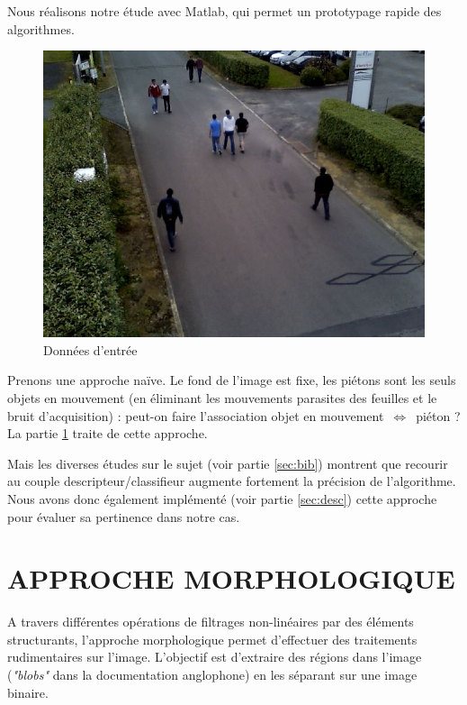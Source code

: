 \documentclass{article}
\begin{document}
	Nous réalisons notre étude avec Matlab, qui permet un prototypage rapide des algorithmes.\\
	
	\begin{figure}
		\begin{center}			
			\includegraphics[scale=0.3]{Img/detection_0156}
		\end{center}
		\caption{Données d'entrée}
	\end{figure}
	
	Prenons une approche naïve. Le fond de l'image est fixe, les piétons sont les seuls objets en mouvement (en éliminant les mouvements parasites des feuilles et le bruit d'acquisition) : peut-on faire l'association objet en mouvement~$\Leftrightarrow $~piéton ? La partie \ref{sec:morpho} traite de cette approche.
	
	
	Mais les diverses études sur le sujet (voir partie \ref{sec:bib}) montrent que recourir au couple descripteur/classifieur augmente fortement la précision de l'algorithme. Nous avons donc également implémenté (voir partie \ref{sec:desc}) cette approche pour évaluer sa pertinence dans notre cas.

\section{APPROCHE MORPHOLOGIQUE}
\label{sec:morpho}

	A travers différentes opérations de filtrages non-linéaires par des éléments structurants, l'approche morphologique permet d'effectuer des traitements rudimentaires sur l'image. L'objectif est d'extraire des régions dans l'image (\emph{"blobs"} dans la documentation anglophone) en les séparant sur une image binaire.
	
\end{document}
